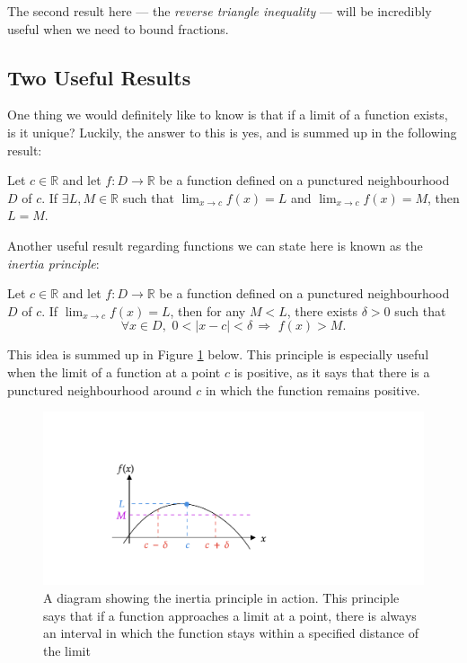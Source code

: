\documentclass[
  12pt,
  a4paper]{extarticle}
\theoremstyle{plain}
\theoremstyle{definition}
\theoremstyle{plain}
\theoremstyle{plain}
\theoremstyle{plain}
\theoremstyle{plain}
\theoremstyle{definition}
\theoremstyle{definition}
\theoremstyle{remark}
\theoremstyle{remark}
\let\BeginKnitrBlock\begin \let\EndKnitrBlock\end
\renewcommand{\;}{\,}
\begin{document}
The second result here --- the \emph{reverse triangle inequality} --- will be incredibly useful when we need to bound fractions.

\hypertarget{two-useful-results}{%
\subsection{Two Useful Results}\label{two-useful-results}}

One thing we would definitely like to know is that if a limit of a function exists, is it unique? Luckily, the answer to this is yes, and is summed up in the following result:
\BeginKnitrBlock{proposition}[Uniqueness of Limits]
{\label{prp:prop1} }Let \(c\in\mathbb{R}\) and let \(f:D \to \mathbb{R}\) be a function defined on a punctured neighbourhood \(D\) of \(c\). If \(\exists L, M \in \mathbb{R}\) such that \(\lim_{x\to c} f(x) = L\) and \(\lim_{x\to c} f(x) = M\), then \(L=M\).
\EndKnitrBlock{proposition}

Another useful result regarding functions we can state here is known as the \emph{inertia principle}:
\BeginKnitrBlock{proposition}[Inertia]
{\label{prp:prop2} }Let \(c\in\mathbb{R}\) and let \(f:D \to \mathbb{R}\) be a function defined on a punctured neighbourhood \(D\) of \(c\). If \(\lim_{x\to c} f(x) = L\), then for any \(M < L\), there exists \(\delta > 0\) such that \[\forall x \in D,\;\; 0 < \lvert x - c \rvert < \delta \; \Rightarrow \;\; f(x) > M.\]
\EndKnitrBlock{proposition}
This idea is summed up in Figure \ref{fig:inertia} below. This principle is especially useful when the limit of a function at a point \(c\) is positive, as it says that there is a punctured neighbourhood around \(c\) in which the function remains positive.

\begin{figure}
\includegraphics[width=\Width,height=\Height]{Inertia} \caption{A diagram showing the inertia principle in action. This principle says that if a function approaches a limit at a point, there is always an interval in which the function stays within a specified distance of the limit}\label{fig:inertia}
\end{figure}
\end{document}
